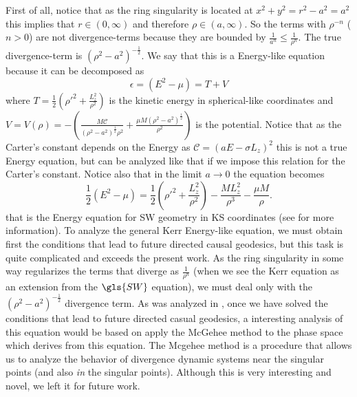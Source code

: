 First of all, notice that as the ring singularity is located at $x^2+y^2=r^2-a^2=a^2$ this implies that $r\in(0,\infty)$ and therefore $\rho \in (a,\infty)$. So the terms with $\rho^{-n}$ ($n>0$) are not divergence-terms because they are bounded by $\frac{1}{a^n} \leq \frac{1}{\rho^n}$. The true divergence-term is $(\rho^2-a^2)^{-\frac{1}{2}}$. We say that this is a Energy-like equation because it can be decomposed as
\begin{equation}
 \epsilon=\left( E^2-\mu \right) = T + V 
\end{equation}
where $T= \frac{1}{2} \left( \rho'^2 +\frac{L_z^2}{\rho^2}\right)$ is the kinetic energy in spherical-like coordinates and $V=V(\rho)=-\left( \frac{ M \mathcal{C}}{(\rho^2-a^2)^\frac{1}{2} \rho^2}+\frac{ \mu  M (\rho^2-a^2)^\frac{1}{2}}{\rho^2} \right)$ is the potential. Notice that as the Carter's constant depends on the Energy as $\mathcal{C}=(a E-\sigma L_z)^2$ this is not a true Energy equation, but can be analyzed like that if we impose this relation for the Carter's constant. Notice also that in the limit $a\to 0$ the equation becomes
\begin{equation}
 \frac{1}{2} \left( E^2-\mu \right) = \frac{1}{2} \left( \rho'^2 +\frac{L_z^2}{\rho^2}\right)-\frac{ M L_z^2}{\rho^3}-\frac{ \mu  M}{\rho}.
\end{equation}
that is the Energy equation for \gls{SW} geometry in \gls{KS} coordinates (see \cite{galindo2014mcgehee} for more information). To analyze the general Kerr Energy-like equation, we must obtain first the conditions that lead to future directed causal geodesics, but this task is quite complicated and exceeds the present work. As the ring singularity in some way regularizes the terms that diverge as $\frac{1}{\rho^n}$ (when we see the Kerr equation as an extension from the $\gls{SW}$ equation), we must deal only with the $(\rho^2-a^2)^{-\frac{1}{2}}$ divergence term. As was analyzed in \cite{galindo2014mcgehee}, once we have solved the conditions that lead to future directed casual geodesics, a interesting analysis of this equation would be based on apply the McGehee method to the phase space which derives from this equation. The Mcgehee method is a procedure that allows us to analyze the behavior of divergence dynamic systems near the singular points (and also \textit{in} the singular points). Although this is very interesting and novel, we left it for future work.
